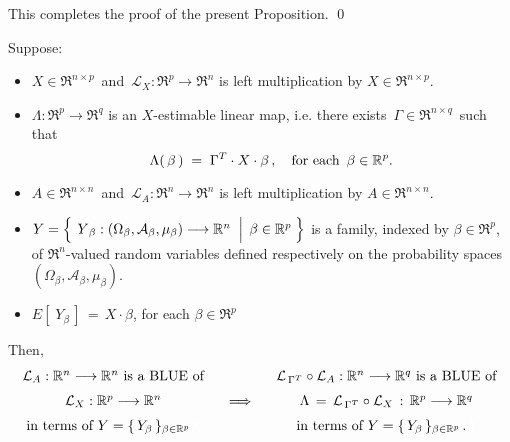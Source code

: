 \vskip 0.5cm
\noindent
This completes the proof of the present Proposition.
\qed

\vskip 0.8cm
\begin{proposition}
\mbox{}\vskip 0.1cm\noindent
Suppose:
\begin{itemize}
\item
	$X \in \Re^{n \times p}$\, and 
	\,$\mathcal{L}_{X} : \Re^{p} \longrightarrow \Re^{n}$ is left multiplication by $X \in \Re^{n \times p}$.
\item
	$\Lambda : \Re^{p} \longrightarrow \Re^{q}$ is an $X$-estimable linear map, i.e.
	there exists \,$\Gamma \in \Re^{n \times q}$\, such that
	\begin{equation*}
	\Lambda(\,\beta\,) \;=\; \Gamma^{T} \cdot X \cdot \beta\,,
	\quad
	\textnormal{for each \,$\beta \in \Re^{p}$}.
	\end{equation*}
\item
	$A \in \Re^{n \times n}$\, and 
	\,$\mathcal{L}_{A} : \Re^{n} \longrightarrow \Re^{n}$ is left multiplication by $A \in \Re^{n \times n}$.
\item
	$Y = \left\{\;
		\left.
		\overset{{\color{white}.}}{Y}_{\beta} : (\Omega_{\beta},\mathcal{A}_{\beta},\mu_{\beta}) \longrightarrow \Re^{n}
		\;\;\right\vert\;
		\beta \in \Re^{p}
		\;\right\}$
	is a family, indexed by $\beta \in \Re^{p}$,
	of $\Re^{n}$-valued random variables defined respectively on the
	probability spaces $(\Omega_{\beta},\mathcal{A}_{\beta},\mu_{\beta})$.
\item
	$E\!\left[\;Y_{\beta}\,\right] \,=\, X \cdot \beta$, for each $\beta \in \Re^{p}$
\end{itemize}
Then, \vskip -0.5cm
\begin{equation*}
\begin{array}{c}
	\textnormal{$\mathcal{L}_{A} : \Re^{n} \longrightarrow \Re^{n}$ is a BLUE of}
	\\
	\textnormal{$\overset{{\color{white}+}}{\mathcal{L}}_{X} : \Re^{p} \longrightarrow \Re^{n}$}
	\\
	\textnormal{in terms of $Y = \{\,Y_{\beta}\,\}_{\beta\in\Re^{p}}$}
		{\color{white}\overset{+}{\Re}}
	\end{array}
\quad\Longrightarrow\quad
\begin{array}{c}
	\textnormal{$\mathcal{L}_{\,\Gamma^{T}} \circ \mathcal{L}_{A} : \Re^{n} \longrightarrow \Re^{q}$ is a BLUE of}
	\\
	\textnormal{$\Lambda \,=\, \overset{{\color{white}+}}{\mathcal{L}}_{\,\Gamma^{T}} \circ \mathcal{L}_{X} \, : \,
		\Re^{p} \longrightarrow \Re^{q}$}
	\\
	\textnormal{in terms of $Y = \{\,Y_{\beta}\,\}_{\beta\in\Re^{p}}$\,.}
		{\color{white}\overset{+}{\Re}}
	\end{array}
\end{equation*}
\end{proposition}

